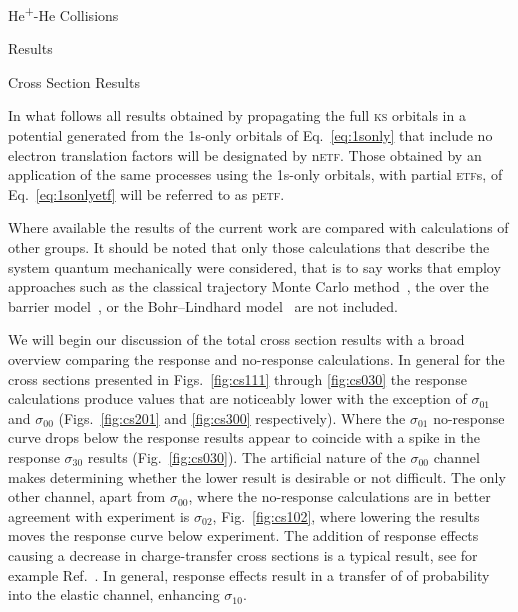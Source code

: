 \documentclass[a5paper, 9 pt]{extreport}
\begin{document}
\begin{chapter}{\texorpdfstring{He\textsuperscript{+}}{He+}-He Collisions \label{chap:hephe}}
\begin{section}{Results \label{sec:hephe-disc}}
      \begin{subsection}{Cross Section Results \label{sec:hephe-res}}

         In what follows all results obtained by propagating the full \textsc{ks} orbitals in a
         potential generated from the 1s-only orbitals of Eq.~\eqref{eq:1sonly} that include no electron
         translation factors will be designated by n\textsc{etf}. Those obtained by an application of
         the same processes using the 1s-only orbitals, with partial \textsc{etf}s, of
         Eq.~\eqref{eq:1sonlyetf} will be referred to as p\textsc{etf}.

         Where available the results of the current work are compared with calculations of other groups.
         It should be noted that only those calculations that describe the system quantum mechanically
         were considered, that is to say works that employ approaches such as the classical trajectory
         Monte Carlo method~\cite{GMZ17}, the over the barrier model~\cite{CC-07}, or the Bohr–Lindhard
         model~\cite{DYC-08, DLZ-12} are not included.

         We will begin our discussion of the total cross section results with a broad overview comparing
         the response and no-response calculations. In general for the cross sections presented in
         Figs.~\ref{fig:cs111} through \ref{fig:cs030} the response calculations produce values that are
         noticeably lower with the exception of $\sigma_{01}$ and $\sigma_{00}$ (Figs.~\ref{fig:cs201}
         and \ref{fig:cs300} respectively). Where the $\sigma_{01}$ no-response curve drops below the
         response results appear to coincide with a spike in the response $\sigma_{30}$ results
         (Fig.~\ref{fig:cs030}). The artificial nature of the $\sigma_{00}$ channel makes determining
         whether the lower result is desirable or not difficult. The only other channel, apart from
         $\sigma_{00}$, where the no-response calculations are in better agreement with experiment is
         $\sigma_{02}$, Fig.~\ref{fig:cs102}, where lowering the results moves the response curve below
         experiment. The addition of response effects causing a decrease in charge-transfer cross
         sections is a typical result, see for example Ref.~\cite{microresp}. In general, response
         effects result in a transfer of of probability into the elastic channel, enhancing
         $\sigma_{10}$.


\end{subsection}
\end{section}
\end{chapter}
\end{document}
